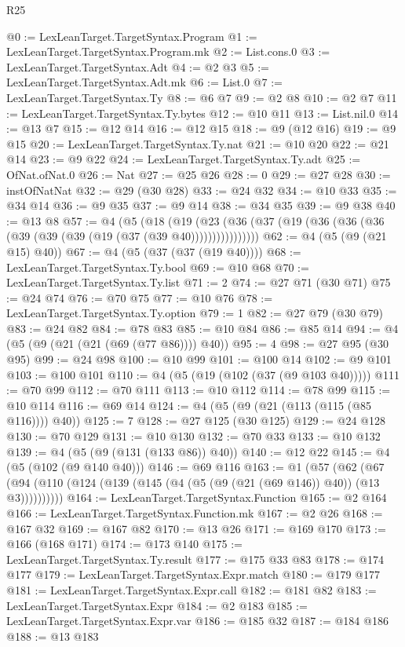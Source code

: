 \begin{lexlean}{R25}
\begin{coremodule}
@0 := LexLeanTarget.TargetSyntax.Program
@1 := LexLeanTarget.TargetSyntax.Program.mk
@2 := List.cons.{0}
@3 := LexLeanTarget.TargetSyntax.Adt
@4 := @2 @3
@5 := LexLeanTarget.TargetSyntax.Adt.mk
@6 := List.{0}
@7 := LexLeanTarget.TargetSyntax.Ty
@8 := @6 @7
@9 := @2 @8
@10 := @2 @7
@11 := LexLeanTarget.TargetSyntax.Ty.bytes
@12 := @10 @11
@13 := List.nil.{0}
@14 := @13 @7
@15 := @12 @14
@16 := @12 @15
@18 := @9 (@12 @16)
@19 := @9 @15
@20 := LexLeanTarget.TargetSyntax.Ty.nat
@21 := @10 @20
@22 := @21 @14
@23 := @9 @22
@24 := LexLeanTarget.TargetSyntax.Ty.adt
@25 := OfNat.ofNat.{0}
@26 := Nat
@27 := @25 @26
@28 := 0
@29 := @27 @28
@30 := instOfNatNat
@32 := @29 (@30 @28)
@33 := @24 @32
@34 := @10 @33
@35 := @34 @14
@36 := @9 @35
@37 := @9 @14
@38 := @34 @35
@39 := @9 @38
@40 := @13 @8
@57 := @4
    (@5
      (@18 (@19 (@23 (@36 (@37 (@19 (@36 (@36 (@36 (@39 (@39 (@39 (@19 (@37 (@39 @40))))))))))))))))
@62 := @4 (@5 (@9 (@21 @15) @40))
@67 := @4 (@5 (@37 (@37 (@19 @40))))
@68 := LexLeanTarget.TargetSyntax.Ty.bool
@69 := @10 @68
@70 := LexLeanTarget.TargetSyntax.Ty.list
@71 := 2
@74 := @27 @71 (@30 @71)
@75 := @24 @74
@76 := @70 @75
@77 := @10 @76
@78 := LexLeanTarget.TargetSyntax.Ty.option
@79 := 1
@82 := @27 @79 (@30 @79)
@83 := @24 @82
@84 := @78 @83
@85 := @10 @84
@86 := @85 @14
@94 := @4 (@5 (@9 (@21 (@21 (@69 (@77 @86)))) @40))
@95 := 4
@98 := @27 @95 (@30 @95)
@99 := @24 @98
@100 := @10 @99
@101 := @100 @14
@102 := @9 @101
@103 := @100 @101
@110 := @4 (@5 (@19 (@102 (@37 (@9 @103 @40)))))
@111 := @70 @99
@112 := @70 @111
@113 := @10 @112
@114 := @78 @99
@115 := @10 @114
@116 := @69 @14
@124 := @4 (@5 (@9 (@21 (@113 (@115 (@85 @116)))) @40))
@125 := 7
@128 := @27 @125 (@30 @125)
@129 := @24 @128
@130 := @70 @129
@131 := @10 @130
@132 := @70 @33
@133 := @10 @132
@139 := @4 (@5 (@9 (@131 (@133 @86)) @40))
@140 := @12 @22
@145 := @4 (@5 (@102 (@9 @140 @40)))
@146 := @69 @116
@163 := @1
    (@57 (@62 (@67 (@94 (@110 (@124 (@139 (@145 (@4 (@5 (@9 (@21 (@69 @146)) @40)) (@13 @3))))))))))
@164 := LexLeanTarget.TargetSyntax.Function
@165 := @2 @164
@166 := LexLeanTarget.TargetSyntax.Function.mk
@167 := @2 @26
@168 := @167 @32
@169 := @167 @82
@170 := @13 @26
@171 := @169 @170
@173 := @166 (@168 @171)
@174 := @173 @140
@175 := LexLeanTarget.TargetSyntax.Ty.result
@177 := @175 @33 @83
@178 := @174 @177
@179 := LexLeanTarget.TargetSyntax.Expr.match
@180 := @179 @177
@181 := LexLeanTarget.TargetSyntax.Expr.call
@182 := @181 @82
@183 := LexLeanTarget.TargetSyntax.Expr
@184 := @2 @183
@185 := LexLeanTarget.TargetSyntax.Expr.var
@186 := @185 @32
@187 := @184 @186
@188 := @13 @183

\end{coremodule}
\end{lexlean}
